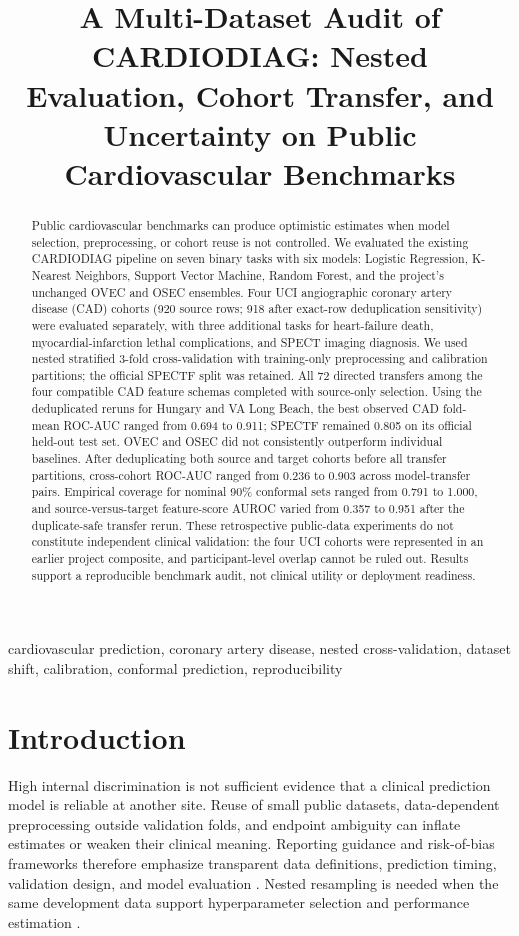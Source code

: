 \documentclass[conference]{IEEEtran}
\title{A Multi-Dataset Audit of CARDIODIAG: Nested Evaluation, Cohort Transfer, and Uncertainty on Public Cardiovascular Benchmarks}
\author{\IEEEauthorblockN{Akhil Preetham E, Ch Hari Krishna, and G Vennela}
\IEEEauthorblockA{Department of Computer Science and Engineering\\
Prasad V. Potluri Siddhartha Institute of Technology, Vijayawada, India\\
\textit{Author order, individual affiliations, contributions, and declarations require confirmation}}}
\begin{document}
\maketitle

\begin{abstract}
Public cardiovascular benchmarks can produce optimistic estimates when model selection, preprocessing, or cohort reuse is not controlled. We evaluated the existing CARDIODIAG pipeline on seven binary tasks with six models: Logistic Regression, K-Nearest Neighbors, Support Vector Machine, Random Forest, and the project’s unchanged OVEC and OSEC ensembles. Four UCI angiographic coronary artery disease (CAD) cohorts (920 source rows; 918 after exact-row deduplication sensitivity) were evaluated separately, with three additional tasks for heart-failure death, myocardial-infarction lethal complications, and SPECT imaging diagnosis. We used nested stratified 3-fold cross-validation with training-only preprocessing and calibration partitions; the official SPECTF split was retained. All 72 directed transfers among the four compatible CAD feature schemas completed with source-only selection. Using the deduplicated reruns for Hungary and VA Long Beach, the best observed CAD fold-mean ROC-AUC ranged from 0.694 to 0.911; SPECTF remained 0.805 on its official held-out test set. OVEC and OSEC did not consistently outperform individual baselines. After deduplicating both source and target cohorts before all transfer partitions, cross-cohort ROC-AUC ranged from 0.236 to 0.903 across model-transfer pairs. Empirical coverage for nominal 90\% conformal sets ranged from 0.791 to 1.000, and source-versus-target feature-score AUROC varied from 0.357 to 0.951 after the duplicate-safe transfer rerun. These retrospective public-data experiments do not constitute independent clinical validation: the four UCI cohorts were represented in an earlier project composite, and participant-level overlap cannot be ruled out. Results support a reproducible benchmark audit, not clinical utility or deployment readiness.
\end{abstract}

\begin{IEEEkeywords}
cardiovascular prediction, coronary artery disease, nested cross-validation, dataset shift, calibration, conformal prediction, reproducibility
\end{IEEEkeywords}

\section{Introduction}
High internal discrimination is not sufficient evidence that a clinical prediction model is reliable at another site. Reuse of small public datasets, data-dependent preprocessing outside validation folds, and endpoint ambiguity can inflate estimates or weaken their clinical meaning. Reporting guidance and risk-of-bias frameworks therefore emphasize transparent data definitions, prediction timing, validation design, and model evaluation \cite{collins2024tripodai,moons2025probastai}. Nested resampling is needed when the same development data support hyperparameter selection and performance estimation \cite{varma2006bias,cawley2010overfitting}.
\end{document}
